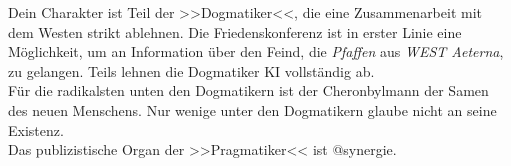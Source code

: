 Dein Charakter ist Teil der >>Dogmatiker<<, die eine Zusammenarbeit mit dem
Westen strikt ablehnen. Die Friedenskonferenz ist in erster Linie eine
Möglichkeit, um an Information über den Feind, die \emph{Pfaffen} aus \emph{WEST
Aeterna}, zu gelangen. Teils lehnen die Dogmatiker KI vollständig ab.\\
Für die radikalsten unten den Dogmatikern ist der Cheronbylmann der Samen des
neuen Menschens. Nur wenige unter den Dogmatikern glaube nicht an seine
Existenz.\\
Das publizistische Organ der >>Pragmatiker<< ist @synergie.
